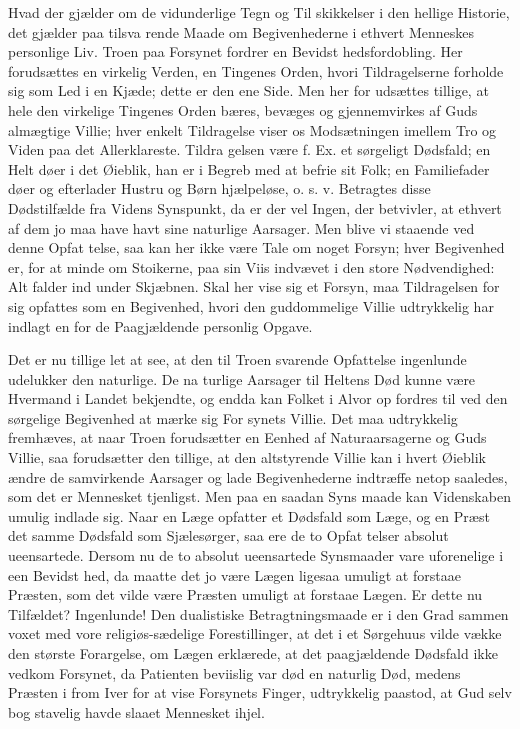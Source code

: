 \documentclass[12pt]{book}
\newcommand{\opage}[1]{\marginnote{\footnotesize\textit{[#1]}}}
\begin{document}
Hvad der gjælder om de vidunderlige Tegn og Til\-%
skikkelser i den hellige Historie, det gjælder paa tilsva\-%
rende Maade om Begivenhederne i ethvert Menneskes
personlige Liv. Troen paa Forsynet fordrer en Bevidst\-%
hedsfordobling. Her forudsættes en virkelig Verden, en
Tingenes Orden, hvori Tildragelserne forholde sig som
Led i en Kjæde; dette er den ene Side. Men her for\-%
udsættes tillige, at hele den virkelige Tingenes Orden
bæres, bevæges og gjennemvirkes af Guds almægtige
Villie; hver enkelt Tildragelse viser os Modsætningen
imellem Tro og Viden paa det Allerklareste. Tildra\-%
gelsen være f. Ex. et sørgeligt Dødsfald; en Helt døer i
det Øieblik, han er i Begreb med at befrie sit Folk;
en Familiefader døer og efterlader Hustru og Børn
\opage{218}\setcounter{footnote}{0}%
hjælpeløse, o. s. v. Betragtes disse Dødstilfælde fra
Videns Synspunkt, da er der vel Ingen, der betvivler,
at ethvert af dem jo maa have havt sine naturlige
Aarsager. Men blive vi staaende ved denne Opfat\-%
telse, saa kan her ikke være Tale om noget Forsyn;
hver Begivenhed er, for at minde om Stoikerne, paa
sin Viis indvævet i den store Nødvendighed: Alt falder
ind under Skjæbnen. Skal her vise sig et Forsyn, maa
Tildragelsen for sig opfattes som en Begivenhed, hvori den
guddommelige Villie udtrykkelig har indlagt en for de
Paagjældende personlig Opgave.

Det er nu tillige let at see, at den til Troen svarende
Opfattelse ingenlunde udelukker den naturlige. De na\-%
turlige Aarsager til Heltens Død kunne være Hvermand
i Landet bekjendte, og endda kan Folket i Alvor op\-%
fordres til ved den sørgelige Begivenhed at mærke sig For\-%
synets Villie. Det maa udtrykkelig fremhæves, at naar
Troen forudsætter en Eenhed af Naturaarsagerne og Guds
Villie, saa forudsætter den tillige, at den altstyrende Villie
kan i hvert Øieblik ændre de samvirkende Aarsager og
lade Begivenhederne indtræffe netop saaledes, som
det er Mennesket tjenligst. Men paa en saadan Syns\-%
maade kan Videnskaben umulig indlade sig. Naar en
Læge opfatter et Dødsfald som Læge, og en Præst det
samme Dødsfald som Sjælesørger, saa ere de to Opfat\-%
telser absolut ueensartede. Dersom nu de to absolut
ueensartede Synsmaader vare uforenelige i een Bevidst\-%
hed, da maatte det jo være Lægen ligesaa umuligt at
forstaae Præsten, som det vilde være Præsten umuligt
at forstaae Lægen. Er dette nu Tilfældet? Ingenlunde!
Den dualistiske Betragtningsmaade er i den Grad sammen\-%
voxet med vore religiøs-sædelige Forestillinger, at det i
et Sørgehuus vilde vække den største Forargelse, om
Lægen erklærede, at det paagjældende Dødsfald ikke
\opage{219}\setcounter{footnote}{0}%
vedkom Forsynet, da Patienten beviislig var død en
naturlig Død, medens Præsten i from Iver for at vise
Forsynets Finger, udtrykkelig paastod, at Gud selv bog\-%
stavelig havde slaaet Mennesket ihjel.
\end{document}
